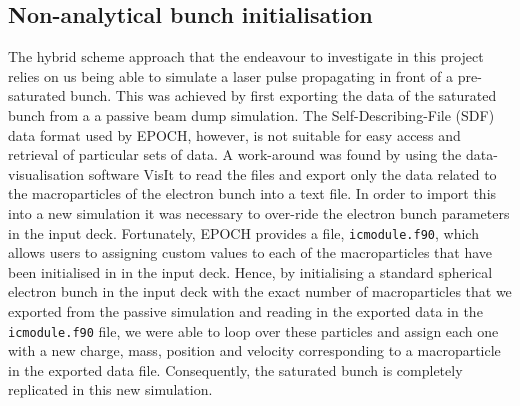 

\subsection{Non-analytical bunch initialisation}
The hybrid scheme approach that the endeavour to investigate in this project relies on us being able to simulate a laser pulse propagating in front of a pre-saturated bunch. 
This was achieved by first exporting the data of the saturated bunch from a a passive beam dump simulation. The Self-Describing-File (SDF) data format used by EPOCH, however, is not suitable for easy access and retrieval of particular sets of data. A work-around was found by using the data-visualisation software VisIt \cite{LANL2005} to read the files and export only the data related to the macroparticles of the electron bunch into a text file. In order to import this into a new simulation it was necessary to over-ride the electron bunch parameters in the input deck. Fortunately, EPOCH provides a file, \texttt{icmodule.f90}, which allows users to assigning custom values to each of the macroparticles that have been initialised in in the input deck. Hence, by initialising a standard spherical electron bunch in the input deck with the exact number of macroparticles that we exported from the passive simulation and reading in the exported data in the \texttt{icmodule.f90} file, we were able to loop over these particles and assign each one with a new charge, mass, position and velocity corresponding to a macroparticle in the exported data file. Consequently, the saturated bunch is completely replicated in this new simulation. 

